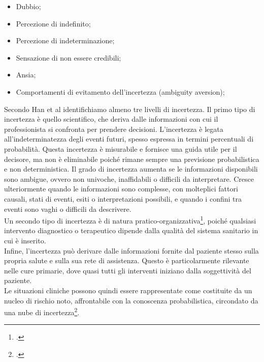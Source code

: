 \begin{itemize}
    \item Dubbio;
    \item Percezione di indefinito;
    \item Percezione di indeterminazione;
    \item Sensazione di non essere credibili;
    \item Ansia;
    \item Comportamenti di evitamento dell'incertezza (ambiguity aversion);
\end{itemize}

\noindent Secondo Han et al identifichiamo almeno tre livelli di incertezza. Il primo tipo di incertezza è quello scientifico, che deriva dalle informazioni con cui il professionista si confronta per prendere decisioni. L'incertezza è legata all'indeterminatezza degli eventi futuri, spesso espressa in termini percentuali di probabilità. Questa incertezza è misurabile e fornisce una guida utile per il decisore, ma non è eliminabile poiché rimane sempre una previsione probabilistica e non deterministica. Il grado di incertezza aumenta se le informazioni disponibili sono ambigue, ovvero non univoche, inaffidabili o difficili da interpretare. Cresce ulteriormente quando le informazioni sono complesse, con molteplici fattori causali, stati di eventi, esiti o interpretazioni possibili, e quando i confini tra eventi sono vaghi o difficili da descrivere.\\
Un secondo tipo di incertezza è di natura pratico-organizzativa\footcite{womak:recenti-progressi-medicina}, poiché qualsiasi intervento diagnostico o terapeutico dipende dalla qualità del sistema sanitario in cui è inserito.\\ 
Infine, l'incertezza può derivare dalle informazioni fornite dal paziente stesso sulla propria salute e sulla sua rete di assistenza. Questo è particolarmente rilevante nelle cure primarie, dove quasi tutti gli interventi iniziano dalla soggettività del paziente.\\

Le situazioni cliniche possono quindi essere rappresentate come costituite da un nucleo di rischio noto, affrontabile con la conoscenza probabilistica, circondato da una nube di incertezza\footcite{womak:decisione-condivisa-kon}.\\

